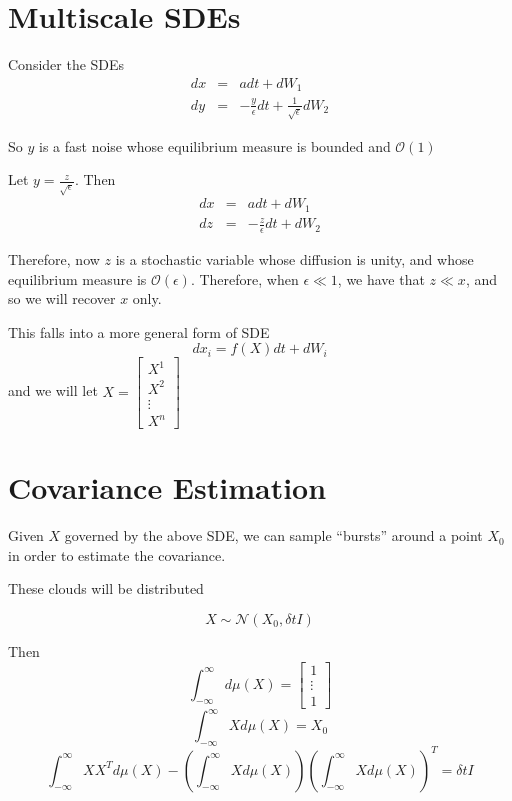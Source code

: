 \documentclass[12pt]{article}
\begin{document}
\section{Multiscale SDEs}

Consider the SDEs
\begin{eqnarray}
dx &=& adt + dW_1\\
dy &=& -\frac{y}{\epsilon} dt + \frac{1}{\sqrt{\epsilon}} dW_2
\end{eqnarray}

So $y$ is a fast noise whose equilibrium measure is bounded and $\mathcal{O}(1)$

Let $y = \frac{z}{\sqrt{\epsilon}}$. Then
\begin{eqnarray}
dx &=& adt + dW_1\\
dz &=& -\frac{z}{\epsilon} dt +  dW_2
\end{eqnarray}

Therefore, now $z$ is a stochastic variable whose diffusion is unity, and whose equilibrium measure is $\mathcal{O}(\epsilon)$. 
%
Therefore, when $\epsilon \ll 1$, we have that $z \ll x$, and so we will recover $x$ only.

This falls into a more general form of SDE
\begin{equation}
dx_i = f(X) dt + dW_i
\end{equation}
and we will let $X = \begin{bmatrix} X^1 \\ X^2 \\ \vdots \\ X^n \end{bmatrix}$

\section{Covariance Estimation}

Given $X$ governed by the above SDE, we can sample ``bursts'' around a point $X_0$ in order to estimate the covariance. 

These clouds will be distributed 

\begin{equation}
X \sim \mathcal{N}\left( X_0, \delta t I \right)
\end{equation}

Then
$$\int_{-\infty}^{\infty} d\mu(X) = \begin{bmatrix} 1 \\ \vdots \\ 1\end{bmatrix}$$
$$\int_{-\infty}^{\infty} X d\mu(X) = X_0$$
$$\int_{-\infty}^{\infty} X X^T d\mu(X) - \left( \int_{-\infty}^{\infty} X d\mu(X) \right) \left( \int_{-\infty}^{\infty} X d\mu(X) \right)^T = \delta t I$$
\end{document}
